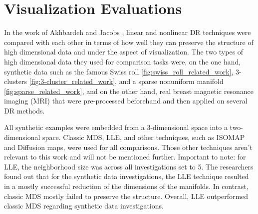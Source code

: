 \section{Visualization Evaluations} \label{sec:vis_eval}

In the work of Akhbardeh and Jacobs \cite{Akhbardeh12}, linear and nonlinear DR techniques were compared with each other in terms of how well they can preserve the structure of high dimensional data and under the aspect of visualization. The two types of high dimensional data they used for comparison tasks were, on the one hand, synthetic data such as the famous Swiss roll \ref{fig:swiss_roll_related_work}, 3-clusters \ref{fig:3-cluster_related_work}, and a sparse nonuniform manifold \ref{fig:sparse_related_work}, and on the other hand, real breast magnetic resonance imaging (MRI) that were pre-processed beforehand and then applied on several DR methods. 

All synthetic examples were embedded from a 3-dimensional space into a two-dimensional space. Classic MDS, LLE, and other techniques, such as ISOMAP and Diffusion maps, were used for all comparisons. Those other techniques aren't relevant to this work and will not be mentioned further. Important to note: for LLE, the neighborhood size was across all investigations set to 5. The researchers found out that for the synthetic data investigations, the LLE technique resulted in a mostly successful reduction of the dimensions of the manifolds. In contrast, classic MDS mostly failed to preserve the structure. Overall, LLE outperformed classic MDS regarding synthetic data investigations.

